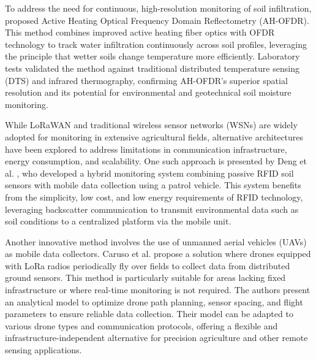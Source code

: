 \documentclass[conference]{IEEEtran}
\begin{document}
To address the need for continuous, high-resolution monitoring of soil infiltration, \cite{sun_2024_highresolution} proposed Active Heating Optical Frequency Domain Reflectometry (AH-OFDR). This method combines improved active heating fiber optics with OFDR technology to track water infiltration continuously across soil profiles, leveraging the principle that wetter soils change temperature more efficiently. Laboratory tests validated the method against traditional distributed temperature sensing (DTS) and infrared thermography, confirming AH-OFDR’s superior spatial resolution and its potential for environmental and geotechnical soil moisture monitoring.

While LoRaWAN and traditional wireless sensor networks (WSNs) are widely adopted for monitoring in extensive agricultural fields, alternative architectures have been explored to address limitations in communication infrastructure, energy consumption, and scalability. One such approach is presented by Deng et al. \cite{deng_2020_novel}, who developed a hybrid monitoring system combining passive RFID soil sensors with mobile data collection using a patrol vehicle. This system benefits from the simplicity, low cost, and low energy requirements of RFID technology, leveraging backscatter communication to transmit environmental data such as soil conditions to a centralized platform via the mobile unit.

Another innovative method involves the use of unmanned aerial vehicles (UAVs) as mobile data collectors. Caruso et al. \cite{caruso_2021_drone} propose a solution where drones equipped with LoRa radios periodically fly over fields to collect data from distributed ground sensors. This method is particularly suitable for areas lacking fixed infrastructure or where real-time monitoring is not required. The authors present an analytical model to optimize drone path planning, sensor spacing, and flight parameters to ensure reliable data collection. Their model can be adapted to various drone types and communication protocols, offering a flexible and infrastructure-independent alternative for precision agriculture and other remote sensing applications.


\end{document}
